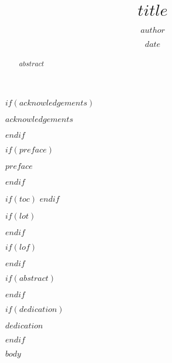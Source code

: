 \documentclass[$degree$]{sapthesis}
\title{$title$}
\author{$author$}
\date{$date$}
\begin{document}
\maketitle

\frontmatter %
\pagestyle{empty} %

$if(acknowledgements)$
  \begin{acknowledgements}
    $acknowledgements$
  \end{acknowledgements}
$endif$

$if(preface)$
  \begin{preface}
    $preface$
  \end{preface}
$endif$

$if(toc)$
  \hypersetup{linkcolor=$if(toccolor)$$toccolor$$else$black$endif$}
  \setcounter{tocdepth}{$toc-depth$}
  \tableofcontents
$endif$

$if(lot)$
  \listoftables
$endif$

$if(lof)$
  \listoffigures
$endif$

$if(abstract)$
  \begin{abstract}
    $abstract$
  \end{abstract}
$endif$

$if(dedication)$
  \begin{dedication}
    $dedication$
  \end{dedication}
$endif$

\mainmatter %
\pagestyle{fancyplain} %

$body$


\end{document}
